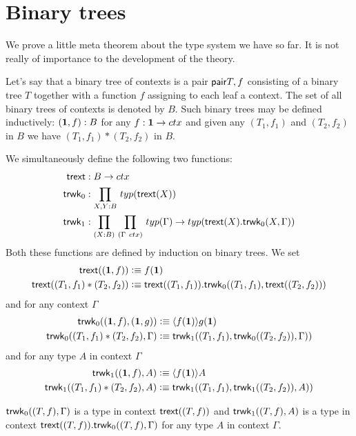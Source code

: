 \section{Binary trees}
We prove a little meta theorem about the type system we have so far. It is not
really of importance to the development of the theory. 

Let's say
that a binary tree of contexts is a pair $\mathsf{pair}{T,f}$ consisting of a binary 
tree $T$ together with a function $f$ assigning to each leaf a context. The set
of all binary trees of contexts is denoted by $B$. Such
binary trees may be defined inductively: $(\mathbf{1},f):B$ for any $f:\mathbf{1}\to ctx$
and given any $(T_1,f_1)$ and $(T_2,f_2)$ in $B$ we have $(T_1,f_1)*(T_2,f_2)$
in $B$.

We simultaneously define
the following two functions:
\begin{align*}
\trext & : B\to ctx\\
\trwk_0 & : \prd{X,Y:B} typ(\trext(X))\\
\trwk_1 & : \prd{X:B}{\Gamma~ctx} typ(\Gamma)\to typ(\ctxext{\trext(X)}{\trwk_0(X,\Gamma)})
\end{align*}
Both these functions are defined by induction on binary trees. We set
\begin{align*}
\trext((\unit,f)) & \defeq f(\unit)\\
\trext((T_1,f_1)*(T_2,f_2)) & \defeq \ctxext{\trext((T_1,f_1))}
{\trwk_0((T_1,f_1),\trext((T_2,f_2)))}
\end{align*}
and for any context $\Gamma$
\begin{align*}
\trwk_0((\unit,f),(\unit,g)) & \defeq \ctxwk{f(\unit)}{g(\unit)}\\
\trwk_0((T_1,f_1)*(T_2,f_2),\Gamma) 
  & \defeq \trwk_1((T_1,f_1),\trwk_0((T_2,f_2)),\Gamma))
\end{align*}
and for any type $A$ in context $\Gamma$
\begin{align*}
\trwk_1((\unit,f),A) & \defeq \ctxwk{f(\unit)}{A}\\
\trwk_1((T_1,f_1)*(T_2,f_2),A) & \defeq
  \trwk_1((T_1,f_1),\trwk_1((T_2,f_2)),A))
\end{align*}

\begin{lem}
$\mathsf{trwk}_0((T,f),\Gamma)$ is a type in context $\mathsf{trext}((T,f))$ and
$\mathsf{trwk}_1((T,f),A)$ is a type in context $\ctxext{\trext((T,f))}{\trwk_0((T,f),\Gamma)}$
for any type $A$ in context $\Gamma$.
\end{lem}

